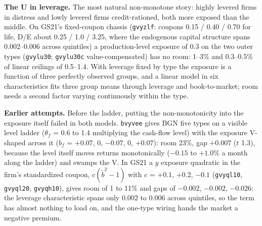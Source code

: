 \noindent\textbf{The U in leverage.} The most natural non-monotone story: highly levered firms in distress and lowly levered firms credit-rationed, both more exposed than the middle. On GS21's fixed-coupon chassis (\texttt{gvyzlf}: coupons 0.15 / 0.40 / 0.70 for life, D/E about 0.25 / 1.0 / 3.25, where the endogenous capital structure spans 0.002--0.006 across quintiles) a production-level exposure of 0.3 on the two outer types (\texttt{gvylu30}; \texttt{gvylu30c} value-compensated) has no room: 1--3\% and 0.3--0.5\% of linear ceilings of 0.5--1.4. With leverage fixed by type the exposure is a function of three perfectly observed groups, and a linear model in six characteristics fits three group means through leverage and book-to-market; room needs a second factor varying continuously within the type.

\noindent\textbf{Earlier attempts.} Before the ladder, putting the non-monotonicity into the exposure itself failed in both models. \texttt{bvyvee} gives BGN five types on a visible level ladder ($\theta_f$ = 0.6 to 1.4 multiplying the cash-flow level) with the exposure V-shaped across it ($b_f$ = $+0.07$, 0, $-0.07$, 0, $+0.07$): room 23\%, gap $+0.007$ ($t$ 1.3), because the level itself moves returns monotonically ($-0.15$ to $+1.0$\% a month along the ladder) and swamps the V. In GS21 a $y$ exposure quadratic in the firm's standardized coupon, $c(\tilde b^2-1)$ with $c$ = $+0.1$, $+0.2$, $-0.1$ (\texttt{gvyql10}, \texttt{gvyql20}, \texttt{gvyqh10}), gives room of 1 to 11\% and gaps of $-0.002$, $-0.002$, $-0.026$: the leverage characteristic spans only 0.002 to 0.006 across quintiles, so the term has almost nothing to load on, and the one-type wiring hands the market a negative premium.


